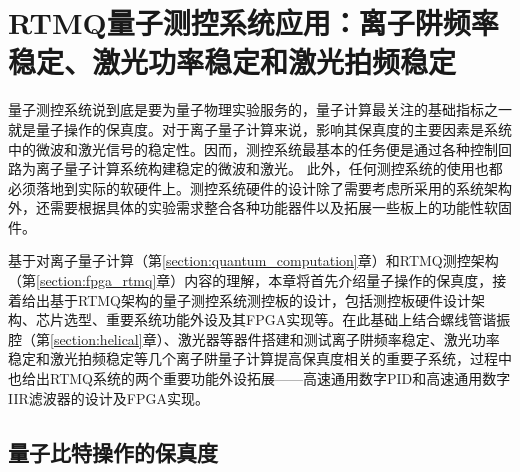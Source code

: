 

\chapter[RTMQ测控系统应用：离子阱频率稳定、激光功率稳定和激光拍频稳定]{RTMQ量子测控系统应用：离子阱频率稳定、激光功率稳定和激光拍频稳定\label{section:implementation}}


量子测控系统说到底是要为量子物理实验服务的，量子计算最关注的基础指标之一就是量子操作的保真度。对于离子量子计算来说，影响其保真度的主要因素是系统中的微波和激光信号的稳定性。因而，测控系统最基本的任务便是通过各种控制回路为离子量子计算系统构建稳定的微波和激光。
此外，任何测控系统的使用也都必须落地到实际的软硬件上。测控系统硬件的设计除了需要考虑所采用的系统架构外，还需要根据具体的实验需求整合各种功能器件以及拓展一些板上的功能性软固件。

基于对离子量子计算（第\ref{section:quantum_computation}章）和RTMQ测控架构（第\ref{section:fpga_rtmq}章）内容的理解，本章将首先介绍量子操作的保真度，接着给出基于RTMQ架构的量子测控系统测控板的设计，包括测控板硬件设计架构、芯片选型、重要系统功能外设及其FPGA实现等。在此基础上结合螺线管谐振腔（第\ref{section:helical}章）、激光器等器件搭建和测试离子阱频率稳定、激光功率稳定和激光拍频稳定等几个离子阱量子计算提高保真度相关的重要子系统，过程中也给出RTMQ系统的两个重要功能外设拓展——高速通用数字PID和高速通用数字IIR滤波器的设计及FPGA实现。






\section[量子比特操作的保真度]{量子比特操作的保真度}


